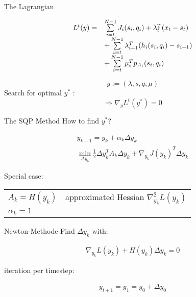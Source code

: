 \begin{frame}{The Lagrangian}
\begin{block}{ }
\begin{align*}
\begin{array}{r l}
  L^{t}(y) = &  \sum\limits_{i=t}^{N-1} J_{i}(s_{i},q_{i})
  + \lambda_{t}^{T}(x_{t} - s_{t}) \\
  & + \sum\limits_{i=t}^{N-1} \lambda_{i+1}^{T} (h_i (s_i ,q_i ) - s_{i+1}) \\
  & + \sum\limits_{i=t}^{N-1} \mu_{i}^{T} p_{A_i}(s_i,q_i)
  \end{array}
\end{align*}
\vspace{.1ex}
\end{block}
$$ y := (\lambda,s,q,\mu) $$
\vspace{1ex}
Search for optimal $y^*$ : \\
\[ \Rightarrow \nabla_{y} L^{t}(y^*)  = 0 \]

\end{frame}

\begin{frame}{The SQP Method}
How to find $y^*$?
\begin{block}{ }
\begin{gather*}
y_{k+1} = y_{k} + \alpha_{k} \Delta y_{k}  \\ 
\min_{\Delta y_k}  \frac{1}{2} \Delta y_k^T A_k \Delta y_k + \nabla_{y_k} J(y_k)^T \Delta y_k
\end{gather*} \vspace{.1ex}
\end{block}
\vspace{1ex}
Special case: \\
\vspace{1ex}
\begin{tabular}{l l}
$ A_{k} = H(y_k)$ & approximated Hessian $\nabla^{2}_{y_k} L(y_k)$ \vspace{1ex} \\
$\alpha_k = 1$ & 
\end{tabular}
\end{frame}

\begin{frame}{Newton-Methode}
Find $\Delta y_k$ with:
\begin{block}{}
\begin{gather*}
\nabla_{y_k} L(y_{k}) + H(y_{k}) \Delta y_{k} = 0
\end{gather*} \vspace{.1ex}
\end{block}
 iteration per timestep:
\begin{block}{ }
\begin{gather*}
y_{t+1} = y_1 = y_0 + \Delta y_0 \\
\end{gather*}
\end{block}
\end{frame}

